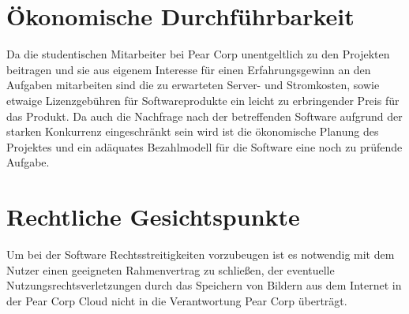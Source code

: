 \documentclass[parskip=full]{scrartcl}
\begin{document}
\section{Ökonomische Durchführbarkeit}
Da die studentischen Mitarbeiter bei Pear Corp unentgeltlich zu den Projekten beitragen und sie aus eigenem Interesse für einen Erfahrungsgewinn an den Aufgaben mitarbeiten sind die zu erwarteten Server- und Stromkosten, sowie etwaige Lizenzgebühren für Softwareprodukte ein leicht zu erbringender Preis für das Produkt. Da auch die Nachfrage nach der betreffenden Software aufgrund der starken Konkurrenz eingeschränkt sein wird ist die ökonomische Planung des Projektes und ein adäquates Bezahlmodell für die Software eine noch zu prüfende Aufgabe.

\section{Rechtliche Gesichtspunkte}
Um bei der Software Rechtsstreitigkeiten vorzubeugen ist es notwendig mit dem Nutzer einen geeigneten Rahmenvertrag zu schließen, der eventuelle Nutzungsrechtsverletzungen durch das Speichern von Bildern aus dem Internet in der Pear Corp \Gls{Cloud} nicht in die Verantwortung Pear Corp überträgt.
%
%
\printnoidxglossaries
\end{document}
